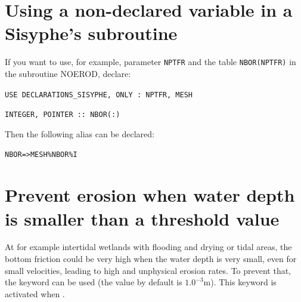 \section{Using a non-declared variable in a Sisyphe's subroutine}
If you want to use, for example, parameter \texttt{NPTFR} and the table \texttt{NBOR(NPTFR)} in the subroutine NOEROD,
declare:

\texttt{USE DECLARATIONS\_SISYPHE, ONLY : NPTFR, MESH}

\texttt{INTEGER, POINTER :: NBOR(:)}

Then the following alias can be declared:

\texttt{NBOR=>MESH\%NBOR\%I}

\section{Prevent erosion when water depth is smaller than a threshold value}
At for example intertidal wetlands with flooding and drying or tidal areas, the bottom friction could be very high when the water depth is very small, even for small velocities, leading to high and unphysical erosion rates. To prevent that, the keyword  can be used (the value by default is $1.0^{-3}$m). This keyword is activated when .

